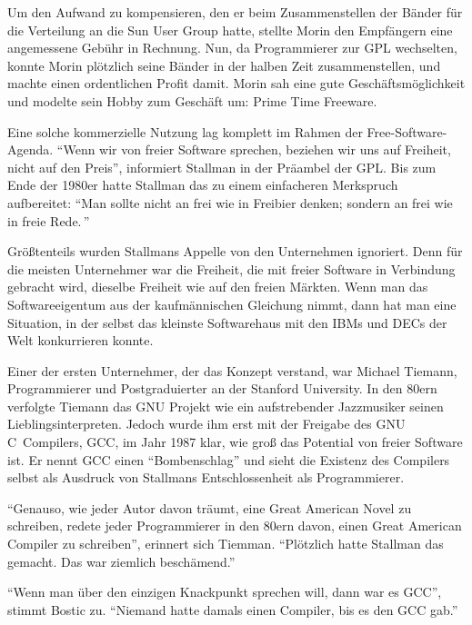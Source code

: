 Um den Aufwand zu kompensieren, den er beim Zusammenstellen der Bänder für die Verteilung an die Sun User Group hatte, stellte Morin den Empfängern eine angemessene Gebühr in Rechnung. Nun, da Programmierer zur GPL wechselten, konnte Morin plötzlich seine Bänder in der halben Zeit zusammenstellen, und machte einen ordentlichen Profit damit. Morin sah eine gute Geschäftsmöglichkeit und modelte sein Hobby zum Geschäft um: Prime Time Freeware.

Eine solche kommerzielle Nutzung lag komplett im Rahmen der Free-Software-Agenda. "`Wenn wir von freier Software sprechen, beziehen wir uns auf Freiheit, nicht auf den Preis"', informiert Stallman in der Präambel der GPL. Bis zum Ende der 1980er hatte Stallman das zu einem einfacheren Merkspruch aufbereitet: "`Man sollte nicht an \glq frei\grq{} wie in \glq Freibier\grq{} denken; sondern an \glq frei\grq{} wie in \glq freie Rede\grq.\,"'

Größtenteils wurden Stallmans Appelle von den Unternehmen ignoriert. Denn für die meisten Unternehmer war die Freiheit, die mit freier Software in Verbindung gebracht wird, dieselbe Freiheit wie auf den freien Märkten. Wenn man das Softwareeigentum aus der kaufmännischen Gleichung nimmt, dann hat man eine Situation, in der selbst das kleinste Softwarehaus mit den IBMs und DECs der Welt konkurrieren konnte.

Einer der ersten Unternehmer, der das Konzept verstand, war Michael Tiemann, Programmierer und Postgraduierter an der Stanford University. In den 80ern verfolgte Tiemann das GNU Projekt wie ein aufstrebender Jazzmusiker seinen Lieblingsinterpreten. Jedoch wurde ihm erst mit der Freigabe des GNU C~Compilers, GCC, im Jahr 1987 klar, wie groß das Potential von freier Software ist. Er nennt GCC einen "`Bombenschlag"' und sieht die Existenz des Compilers selbst als Ausdruck von Stallmans Entschlossenheit als Programmierer.

"`Genauso, wie jeder Autor davon träumt, eine Great American Novel zu schreiben, redete jeder Programmierer in den 80ern davon, einen Great American Compiler zu schreiben"', erinnert sich Tiemman. "`Plötzlich hatte Stallman das gemacht. Das war ziemlich beschämend."'

"`Wenn man über den einzigen Knackpunkt sprechen will, dann war es GCC"', stimmt Bostic zu. "`Niemand hatte damals einen Compiler, bis es den GCC gab."'

